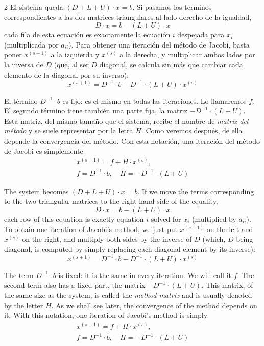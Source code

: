 \begin{paracol}{2}
El sistema queda $(D+L+U)\cdot x=b$. Si pasamos los términos correspondientes a las dos matrices triangulares al lado derecho de la igualdad,
\begin{equation*}
D\cdot x = b-(L+U)\cdot x
\end{equation*}
cada fila de esta ecuación es exactamente la ecuación $i$ despejada para $x_i$ (multiplicada por $a_{ii}$). Para obtener una iteración del método de Jacobi, basta poner $x^{(s+1)}$ a la izquierda y $x^{(s)}$ a la derecha, y multiplicar ambos lados por la inversa de $D$ (que, al ser $D$ diagonal, se calcula sin más que cambiar cada elemento de la diagonal por su inverso):
\begin{equation*}
x^{(s+1)}=D^{-1}\cdot b- D^{-1}\cdot\left(L+U\right)\cdot x^{(s)}
\end{equation*}

El término $D^{-1}\cdot b$ es fijo: es el mismo en todas las iteraciones. Lo llamaremos $f$. El segundo término tiene también una parte fija, la matriz $-D^{-1}\cdot(L+U)$. Esta matriz, del mismo tamaño que el sistema, recibe el nombre de \emph{matriz del método} y se suele representar por la letra $H$. Como veremos después, de ella depende la convergencia del método. Con esta notación, una iteración del método de Jacobi es simplemente
\begin{gather*}
x^{(s+1)}=f+H\cdot x^{(s)},\\
f=D^{-1}\cdot b, \quad H=-D^{-1}\cdot(L+U)
\end{gather*}

\switchcolumn
The system becomes $(D+L+U)\cdot x=b$. If we move the terms corresponding to the two triangular matrices to the right-hand side of the equality,
\begin{equation*}
D\cdot x = b-(L+U)\cdot x
\end{equation*}
each row of this equation is exactly equation $i$ solved for $x_i$ (multiplied by $a_{ii}$). To obtain one iteration of Jacobi's method, we just put $x^{(s+1)}$ on the left and $x^{(s)}$ on the right, and multiply both sides by the inverse of $D$ (which, $D$ being diagonal, is computed by simply replacing each diagonal element by its inverse):
\begin{equation*}
x^{(s+1)}=D^{-1}\cdot b- D^{-1}\cdot\left(L+U\right)\cdot x^{(s)}
\end{equation*}

The term $D^{-1}\cdot b$ is fixed: it is the same in every iteration. We will call it $f$. The second term also has a fixed part, the matrix $-D^{-1}\cdot(L+U)$. This matrix, of the same size as the system, is called the \emph{method matrix} and is usually denoted by the letter $H$. As we shall see later, the convergence of the method depends on it. With this notation, one iteration of Jacobi's method is simply
\begin{gather*}
x^{(s+1)}=f+H\cdot x^{(s)},\\
f=D^{-1}\cdot b, \quad H=-D^{-1}\cdot(L+U)
\end{gather*}


\end{paracol}

